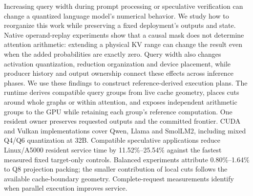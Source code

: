 Increasing query width during prompt processing or speculative verification can change a quantized language model's numerical behavior. We study how to reorganize this work while preserving a fixed deployment's outputs and state. Native operand-replay experiments show that a causal mask does not determine attention arithmetic: extending a physical KV range can change the result even when the added probabilities are exactly zero. Query width also changes activation quantization, reduction organization and device placement, while producer history and output ownership connect these effects across inference phases. We use these findings to construct reference-derived execution plans. The runtime derives compatible query groups from live cache geometry, places cuts around whole graphs or within attention, and exposes independent arithmetic groups to the GPU while retaining each group's reference computation. One resident owner preserves requested outputs and the committed frontier. CUDA and Vulkan implementations cover Qwen, Llama and SmolLM2, including mixed Q4/Q6 quantization at 32B. Compatible speculative applications reduce Linux/A5000 resident service time by 11.52\%--25.54\% against the fastest measured fixed target-only controls. Balanced experiments attribute 0.80\%--1.64\% to Q8 projection packing; the smaller contribution of local cuts follows the available cache-boundary geometry. Complete-request measurements identify when parallel execution improves service.
